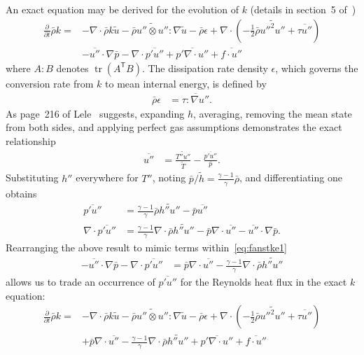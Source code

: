 \documentclass[letterpaper,11pt,nointlimits,reqno]{amsart}
\newcommand{\trans}[1]{{#1}^{\ensuremath{\mathsf{T}}}}
\DeclareMathOperator{\trace}{tr}
\begin{document}
An exact equation may be derived for the evolution of $k$ (details in section~5
of~\cite{OliverFANSModels2011})
\begin{align}
\label{eq:fanstke1}
    \frac{\partial{}}{\partial{}t}\bar{\rho}k
 =
 &- \nabla\cdot\bar{\rho}k\tilde{u}
  - \bar{\rho} \widetilde{u''\otimes{}u''} : \nabla\tilde{u}
  - \bar{\rho} \epsilon
  + \nabla\cdot\left(
        -\frac{1}{2}\bar{\rho}\widetilde{{u''}^{2}u''}
      + \overline{\tau{}u''}
    \right)
\\
 &- \overline{u''}\cdot\nabla\bar{p}
  - \nabla\cdot\overline{p' u''}
  + \overline{p' \nabla\cdot{}u''}
  + \overline{f\cdot{}u''}
\end{align}
where $A:B$ denotes $\trace \left(\trans{A} B\right)$. The dissipation rate
density $\epsilon$, which governs the conversion rate from $k$ to mean internal
energy, is defined by
\begin{align}
  \bar{\rho} \epsilon &= \overline{\tau : \nabla{}u''}
.
\end{align}
As page~216 of Lele~\cite{Lele1994Compressibility} suggests, expanding $h$,
averaging, removing the mean state from both sides, and applying perfect gas
assumptions demonstrates the exact relationship
\begin{align}
  \overline{u''}
&=
  \frac{\widetilde{T''u''}}{\tilde{T}} - \frac{\overline{p'u''}}{\bar{p}}
.
\end{align}
Substituting $h''$ everywhere for $T''$, noting $\bar{p}/\tilde{h} =
\frac{\gamma-1}{\gamma}\bar{\rho}$, and differentiating one obtains
\begin{align}
  \overline{p'u''}
&=
  \frac{\gamma-1}{\gamma} \bar{\rho} \widetilde{h''u''}
- \bar{p} \overline{u''}
\\
  \nabla\cdot \overline{p'u''}
&=
  \frac{\gamma-1}{\gamma} \nabla\cdot \bar{\rho} \widetilde{h''u''}
- \bar{p}\nabla\cdot\overline{u''}
- \overline{u''}\cdot\nabla{}\bar{p}
.
\end{align}
Rearranging the above result to mimic terms within~\eqref{eq:fanstke1}
\begin{align}
  - \overline{u''}\cdot\nabla\bar{p}
  - \nabla\cdot\overline{p'u''}
&=
  \bar{p}\nabla\cdot\overline{u''}
- \frac{\gamma-1}{\gamma} \nabla\cdot \bar{\rho} \widetilde{h''u''}
\end{align}
allows us to trade an occurrence of $\overline{p'u''}$ for the Reynolds heat
flux in the exact $k$ equation:
\begin{align}
\label{eq:fanstke}
    \frac{\partial{}}{\partial{}t}\bar{\rho}k
 =
 &- \nabla\cdot\bar{\rho}k\tilde{u}
  - \bar{\rho} \widetilde{u''\otimes{}u''} : \nabla\tilde{u}
  - \bar{\rho} \epsilon
  + \nabla\cdot\left(
        -\frac{1}{2}\bar{\rho}\widetilde{{u''}^{2}u''}
      + \overline{\tau{}u''}
    \right)
\\
 &+ \bar{p}\nabla\cdot\overline{u''}
  - \frac{\gamma-1}{\gamma} \nabla\cdot\bar{\rho} \widetilde{h''u''}
  + \overline{p' \nabla\cdot{}u''}
  + \overline{f\cdot{}u''}
\end{align}
\end{document}
